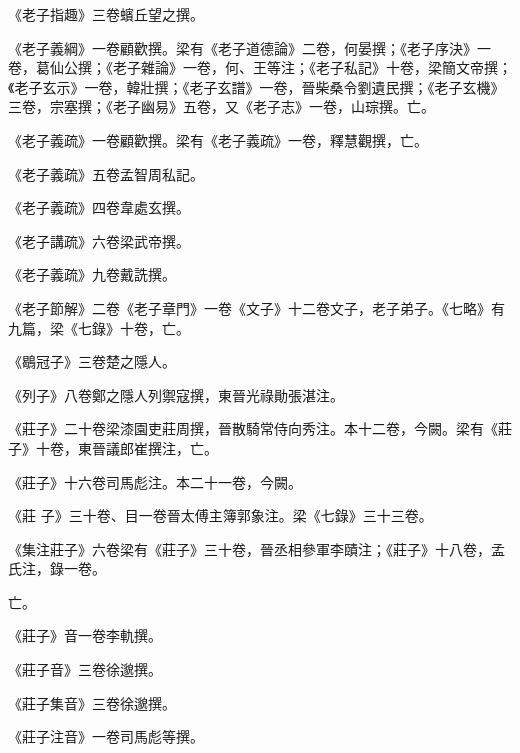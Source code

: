 \begin{pinyinscope}
 《老子指趣》三卷蠙丘望之撰。



 《老子義綱》一卷顧歡撰。梁有《老子道德論》二卷，何晏撰；《老子序決》一卷，葛仙公撰；《老子雜論》一卷，何、王等注；《老子私記》十卷，梁簡文帝撰；《老子玄示》一卷，韓壯撰；《老子玄譜》一卷，晉柴桑令劉遺民撰；《老子玄機》三卷，宗塞撰；《老子幽易》五卷，又《老子志》一卷，山琮撰。亡。



 《老子義疏》一卷顧歡撰。梁有《老子義疏》一卷，釋慧觀撰，亡。



 《老子義疏》五卷孟智周私記。



 《老子義疏》四卷韋處玄撰。



 《老子講疏》六卷梁武帝撰。



 《老子義疏》九卷戴詵撰。



 《老子節解》二卷《老子章門》一卷《文子》十二卷文子，老子弟子。《七略》有九篇，梁《七錄》十卷，亡。



 《鶡冠子》三卷楚之隱人。



 《列子》八卷鄭之隱人列禦寇撰，東晉光祿勛張湛注。



 《莊子》二十卷梁漆園吏莊周撰，晉散騎常侍向秀注。本十二卷，今闕。梁有《莊子》十卷，東晉議郎崔撰注，亡。



 《莊子》十六卷司馬彪注。本二十一卷，今闕。



 《莊
 子》三十卷、目一卷晉太傅主簿郭象注。梁《七錄》三十三卷。



 《集注莊子》六卷梁有《莊子》三十卷，晉丞相參軍李賾注；《莊子》十八卷，孟氏注，錄一卷。



 亡。



 《莊子》音一卷李軌撰。



 《莊子音》三卷徐邈撰。



 《莊子集音》三卷徐邈撰。



 《莊子注音》一卷司馬彪等撰。




\end{pinyinscope}
